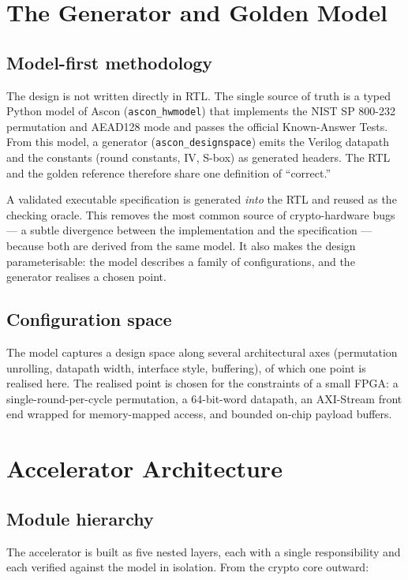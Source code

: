 \documentclass[11pt,a4paper]{article}
\newcommand{\choice}[2]{%
  \begin{tcolorbox}[
    enhanced, colback=reqbg, colframe=reqframe,
    arc=2pt, boxrule=0.5pt, left=6pt, right=6pt, top=3pt, bottom=3pt,
    attach boxed title to top left={yshift=-2mm, xshift=8pt},
    boxed title style={colback=reqframe, arc=2pt, boxrule=0pt,
                       left=4pt, right=4pt, top=2pt, bottom=2pt},
    title={\small\bfseries\color{white}Design choice\enspace\textbar\enspace\textit{#1}},
    before upper={\small}]
  #2
  \end{tcolorbox}\vspace{3pt}}
\newcommand{\code}[1]{\texttt{\small #1}}
\begin{document}
\section{The Generator and Golden Model}

\subsection{Model-first methodology}
The design is not written directly in RTL. The single source of truth is a typed
Python model of Ascon (\code{ascon\_hwmodel}) that implements the NIST SP 800-232
permutation and AEAD128 mode and passes the official Known-Answer Tests. From this
model, a generator (\code{ascon\_designspace}) emits the Verilog datapath and the
constants (round constants, IV, S-box) as generated headers. The RTL and the
golden reference therefore share one definition of ``correct.''

\choice{Golden-model-first over hand-written RTL}{%
A validated executable specification is generated \emph{into} the RTL and reused
as the checking oracle. This removes the most common source of crypto-hardware
bugs --- a subtle divergence between the implementation and the specification ---
because both are derived from the same model. It also makes the design
parameterisable: the model describes a family of configurations, and the
generator realises a chosen point.}

\subsection{Configuration space}
The model captures a design space along several architectural axes (permutation
unrolling, datapath width, interface style, buffering), of which one point is
realised here. The realised point is chosen for the constraints of a small FPGA:
a single-round-per-cycle permutation, a 64-bit-word datapath, an AXI-Stream front
end wrapped for memory-mapped access, and bounded on-chip payload buffers.

\section{Accelerator Architecture}

\subsection{Module hierarchy}
The accelerator is built as five nested layers, each with a single
responsibility and each verified against the model in isolation. From the crypto
core outward:
\end{document}
